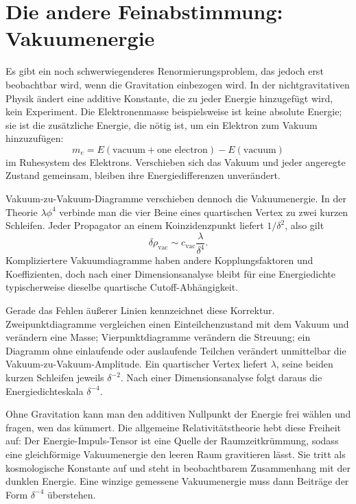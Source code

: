 \section{Die andere Feinabstimmung: Vakuumenergie}

Es gibt ein noch schwerwiegenderes Renormierungsproblem, das jedoch erst beobachtbar wird, wenn die Gravitation einbezogen wird. In der nichtgravitativen Physik ändert eine additive Konstante, die zu jeder Energie hinzugefügt wird, kein Experiment. Die Elektronenmasse beispielsweise ist keine absolute Energie; sie ist die zusätzliche Energie, die nötig ist, um ein Elektron zum Vakuum hinzuzufügen:
\begin{equation}
m_e=E(\text{vacuum}+\text{one electron})-E(\text{vacuum})
\end{equation}
im Ruhesystem des Elektrons. Verschieben sich das Vakuum und jeder angeregte Zustand gemeinsam, bleiben ihre Energiedifferenzen unverändert.

Vakuum-zu-Vakuum-Diagramme verschieben dennoch die Vakuumenergie. In der Theorie \(\lambda\phi^4\) verbinde man die vier Beine eines quartischen Vertex zu zwei kurzen Schleifen. Jeder Propagator an einem Koinzidenzpunkt liefert \(1/\delta^2\), also gilt
\begin{equation}
\delta\rho_{\mathrm{vac}}
\sim
c_{\mathrm{vac}}\frac{\lambda}{\delta^4}.
\label{eq:vacuum-energy-divergence}
\end{equation}
Kompliziertere Vakuumdiagramme haben andere Kopplungsfaktoren und Koeffizienten, doch nach einer Dimensionsanalyse bleibt für eine Energiedichte typischerweise dieselbe quartische Cutoff-Abhängigkeit.

Gerade das Fehlen äußerer Linien kennzeichnet diese Korrektur. Zweipunktdiagramme vergleichen einen Einteilchenzustand mit dem Vakuum und verändern eine Masse; Vierpunktdiagramme verändern die Streuung; ein Diagramm ohne einlaufende oder auslaufende Teilchen verändert unmittelbar die Vakuum-zu-Vakuum-Amplitude. Ein quartischer Vertex liefert \(\lambda\), seine beiden kurzen Schleifen jeweils \(\delta^{-2}\). Nach einer Dimensionsanalyse folgt daraus die Energiedichteskala \(\delta^{-4}\).

Ohne Gravitation kann man den additiven Nullpunkt der Energie frei wählen und fragen, wen das kümmert. Die allgemeine Relativitätstheorie hebt diese Freiheit auf: Der Energie-Impuls-Tensor ist eine Quelle der Raumzeitkrümmung, sodass eine gleichförmige Vakuumenergie den leeren Raum gravitieren lässt. Sie tritt als kosmologische Konstante auf und steht in beobachtbarem Zusammenhang mit der dunklen Energie. Eine winzige gemessene Vakuumenergie muss dann Beiträge der Form \(\delta^{-4}\) überstehen.

